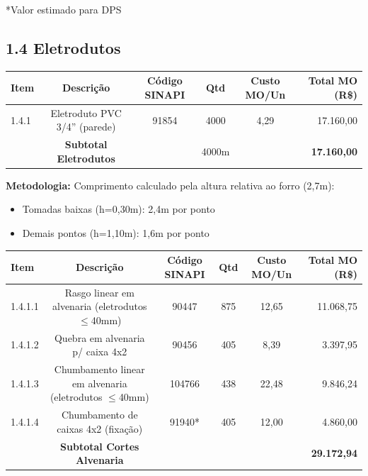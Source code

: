 \documentclass[12pt,a4paper]{article}
\renewenvironment{table}%
{\begin{center}%
\scriptsize%
\addtolength{\tabcolsep}{-2pt}%
}%
{\end{center}}
\begin{document}
\noindent\small{*Valor estimado para DPS}

\subsection{1.4 Eletrodutos}

\begin{table}
\centering
\begin{tabular}{lccccr}
\toprule
\textbf{Item} & \textbf{Descrição} & \textbf{Código SINAPI} & \textbf{Qtd} & \textbf{Custo MO/Un} & \textbf{Total MO (R\$)} \\
\midrule
1.4.1 & Eletroduto PVC 3/4'' (parede) & 91854 & 4000 & 4,29 & 17.160,00 \\
\midrule
 & \textbf{Subtotal Eletrodutos} & & 4000m & & \textbf{17.160,00} \\
\bottomrule
\end{tabular}
\end{table}


\noindent\textbf{Metodologia:} Comprimento calculado pela altura relativa ao forro (2,7m):
\begin{itemize}
    \item Tomadas baixas (h=0,30m): 2,4m por ponto
    \item Demais pontos (h=1,10m): 1,6m por ponto
\end{itemize}

\begin{table}
\centering
\begin{tabular}{lccccr}
\toprule
\textbf{Item} & \textbf{Descrição} & \textbf{Código SINAPI} & \textbf{Qtd} & \textbf{Custo MO/Un} & \textbf{Total MO (R\$)} \\
\midrule
1.4.1.1 & Rasgo linear em alvenaria (eletrodutos $\leq$40mm) & 90447 & 875 & 12,65 & 11.068,75 \\
1.4.1.2 & Quebra em alvenaria p/ caixa 4x2 & 90456 & 405 & 8,39 & 3.397,95 \\
1.4.1.3 & Chumbamento linear em alvenaria (eletrodutos $\leq$40mm) & 104766 & 438 & 22,48 & 9.846,24 \\
1.4.1.4 & Chumbamento de caixas 4x2 (fixação) & 91940* & 405 & 12,00 & 4.860,00 \\
\midrule
 & \textbf{Subtotal Cortes Alvenaria} & & & & \textbf{29.172,94} \\
\bottomrule
\end{tabular}
\end{table}
\end{document}

